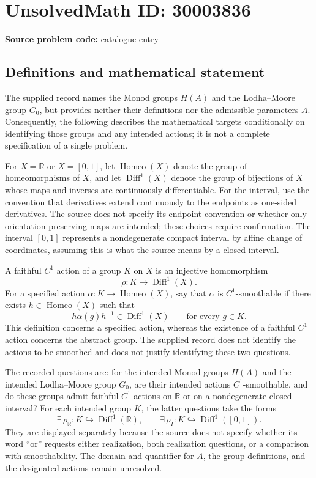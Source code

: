 \documentclass[11pt]{article}
\newcommand{\R}{\mathbb{R}}
\begin{document}
\section*{UnsolvedMath ID: 30003836}
\textbf{Source problem code:} catalogue entry
\subsection{Definitions and mathematical statement}
The supplied record names the Monod groups \(H(A)\) and the Lodha--Moore group \(G_0\), but provides neither their definitions nor the admissible parameters \(A\). Consequently, the following describes the mathematical targets conditionally on identifying those groups and any intended actions; it is not a complete specification of a single problem.

For \(X=\R\) or \(X=[0,1]\), let \(\operatorname{Homeo}(X)\) denote the group of homeomorphisms of \(X\), and let \(\operatorname{Diff}^{1}(X)\) denote the group of bijections of \(X\) whose maps and inverses are continuously differentiable. For the interval, use the convention that derivatives extend continuously to the endpoints as one-sided derivatives. The source does not specify its endpoint convention or whether only orientation-preserving maps are intended; these choices require confirmation. The interval \([0,1]\) represents a nondegenerate compact interval by affine change of coordinates, assuming this is what the source means by a closed interval.

A faithful \(C^1\) action of a group \(K\) on \(X\) is an injective homomorphism
\[
\rho:K\longrightarrow\operatorname{Diff}^{1}(X).
\]
For a specified action \(\alpha:K\to\operatorname{Homeo}(X)\), say that \(\alpha\) is \(C^1\)-smoothable if there exists \(h\in\operatorname{Homeo}(X)\) such that
\[
h\alpha(g)h^{-1}\in\operatorname{Diff}^{1}(X)
\qquad\text{for every }g\in K.
\]
This definition concerns a specified action, whereas the existence of a faithful \(C^1\) action concerns the abstract group. The supplied record does not identify the actions to be smoothed and does not justify identifying these two questions.

The recorded questions are: for the intended Monod groups \(H(A)\) and the intended Lodha--Moore group \(G_0\), are their intended actions \(C^1\)-smoothable, and do these groups admit faithful \(C^1\) actions on \(\R\) or on a nondegenerate closed interval? For each intended group \(K\), the latter questions take the forms
\[
\exists\,\rho_{\R}:K\hookrightarrow\operatorname{Diff}^{1}(\R),
\qquad
\exists\,\rho_I:K\hookrightarrow\operatorname{Diff}^{1}([0,1]).
\]
They are displayed separately because the source does not specify whether its word ``or'' requests either realization, both realization questions, or a comparison with smoothability. The domain and quantifier for \(A\), the group definitions, and the designated actions remain unresolved.
\end{document}
